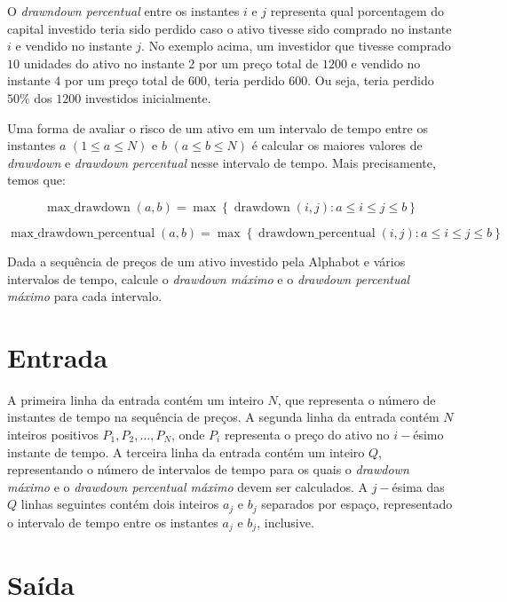 O \emph{drawndown percentual} entre os instantes $i$ e $j$ representa qual porcentagem do capital investido teria sido perdido caso o ativo tivesse sido comprado no instante $i$ e vendido no instante $j$. No exemplo acima, um investidor que tivesse comprado $10$ unidades do ativo no instante $2$ por um preço total de $1200$ e vendido no instante $4$ por um preço total de $600$, teria perdido $600$. Ou seja, teria perdido $50\%$ dos $1200$ investidos inicialmente.


Uma forma de avaliar o risco de um ativo em um intervalo de tempo entre os instantes $a$ $(1 \leq a \leq N)$ e $b$ $(a \leq b \leq N)$ é calcular os maiores valores de \emph{drawdown} e \emph{drawdown percentual} nesse intervalo de tempo. Mais precisamente, temos que:

\begin{equation*}
    \operatorname{max\_drawdown}\left(a, b\right) = \max\left\{\operatorname{drawdown}\left(i, j\right) : {a \leq i \leq j \leq b}\right\}
\end{equation*}

\begin{equation*}
    \operatorname{max\_drawdown\_percentual}\left(a, b\right) = \max\left\{\operatorname{drawdown\_percentual}\left(i, j\right) : {a \leq i \leq j \leq b}\right\}
\end{equation*}

Dada a sequência de preços de um ativo investido pela Alphabot e vários intervalos de tempo, calcule o \emph{drawdown máximo} e o \emph{drawdown percentual máximo} para cada intervalo.

\section*{Entrada}

A primeira linha da entrada contém um inteiro $N$, que representa o número de instantes de tempo na sequência de preços.
A segunda linha da entrada contém $N$ inteiros positivos $P_1, P_2, \ldots, P_N$, onde $P_i$ representa o preço do ativo no $i-$ésimo instante de tempo.
A terceira linha da entrada contém um inteiro $Q$, representando o número de intervalos de tempo para os quais o \emph{drawdown máximo} e o
\emph{drawdown percentual máximo}  devem ser calculados.
A $j-$ésima das $Q$ linhas seguintes contém dois inteiros $a_j$ e $b_j$ separados por espaço, representado o intervalo de tempo entre os instantes $a_j$ e $b_j$, inclusive. 
\section*{Saída}

